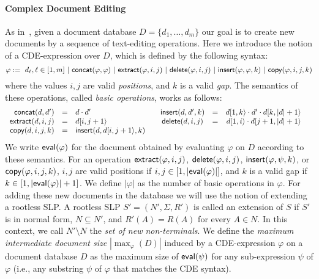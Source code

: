 \paragraph{Complex Document Editing}
As in~\cite{SchmidS22}, given a document database $D = \{d_1, \ldots, d_m\}$ our goal is to create new documents by a sequence of text-editing operations.
Here we introduce the notion of a CDE-expression over $D$, which is defined by the following syntax:
$$
	\varphi := \ d_\ell, \ell\in[1, m]\ | \ \textsf{concat}(\varphi, \varphi)\ | \ \textsf{extract}(\varphi, i, j) \ | \
	\textsf{delete}(\varphi, i, j) \ | \ \textsf{insert}(\varphi, \varphi, k) \ | \ \textsf{copy}(\varphi, i, j, k)
$$
where the values $i,j$ are valid {\it positions}, and $k$ is a valid {\it gap}. %
The semantics of these operations, called {\it basic operations}, works as follows:
$$
\begin{array}{rclrclrclrcl}
	\textsf{concat}(d, d') &=& d\cdot d' \ \ \ &&\textsf{insert}(d, d', k) &=& d[1,k\rangle\cdot d'\cdot d[k,|d|+1\rangle&\\
	\textsf{extract}(d, i, j) &=& d[i,j+1\rangle \ \ \ &&\textsf{delete}(d, i, j) &=& d[1,i\rangle\cdot d[j+1,|d|+1\rangle&\\
	\textsf{copy}(d, i, j, k) &=& \textsf{insert}(d, d[i,j+1\rangle, k) 	
\end{array}
$$
We write $\textsf{eval}(\varphi)$ for the document obtained by evaluating $\varphi$ on $D$ according to these semantics. For an operation $\textsf{extract}(\varphi, i, j)$, $\textsf{delete}(\varphi, i, j)$, $\textsf{insert}(\varphi, \psi, k)$, or $\textsf{copy}(\varphi, i, j, k)$, $i,j$ are valid positions if $i, j\in [1, |\textsf{eval}(\varphi)|]$, and $k$ is a valid gap if $k\in [1, |\textsf{eval}(\varphi)| + 1]$.
We define $|\varphi|$ as the number of basic operations in $\varphi$.
For adding these new documents in the database we will use the notion of extending a rootless SLP. A rootless SLP $S' = (N', \Sigma, R')$ is called an extension of $S$ if $S'$ is in normal form, $N\subseteq N'$, and $R'(A) = R(A)$ for every $A\in N$. In this context, we call $N'\setminus N$ the {\it set of new non-terminals}.
We define the {\it maximum intermediate document size} $|\max_{\varphi}(D)|$ induced by a CDE-expression $\varphi$ on a document database $D$ as the maximum size of $\textsf{eval}(\psi)$ for any sub-expression $\psi$ of $\varphi$ (i.e., any substring $\psi$ of $\varphi$ that matches the CDE syntax).


